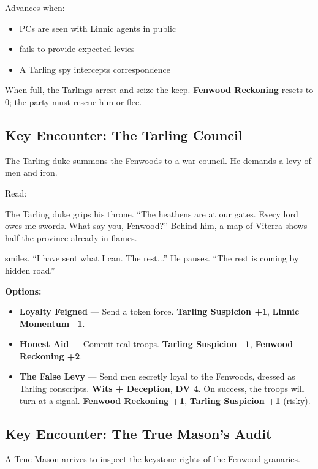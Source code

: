\documentclass[11pt,a5paper]{book}
\newcommand{\dv}[1]{\textbf{DV #1}}
\begin{document}
Advances when:
\begin{itemize}[leftmargin=*]
\item PCs are seen with Linnic agents in public
\item \aldric{} fails to provide expected levies
\item A Tarling spy intercepts correspondence
\end{itemize}
When full, the Tarlings arrest \aldric{} and seize the keep. \textbf{Fenwood Reckoning} resets to 0; the party must rescue him or flee.

\subsection*{Key Encounter: The Tarling Council}

The Tarling duke summons the Fenwoods to a war council. He demands a levy of men and iron.

Read:
\begin{quoting}
The Tarling duke grips his throne. ``The heathens are at our gates. Every lord owes me swords. What say you, Fenwood?'' Behind him, a map of Viterra shows half the province already in flames.

\aldric{} smiles. ``I have sent what I can. The rest...'' He pauses. ``The rest is coming by hidden road.''
\end{quoting}

\textbf{Options:}
\begin{itemize}[leftmargin=*]
\item \textbf{Loyalty Feigned} --- Send a token force. \textbf{Tarling Suspicion +1}, \textbf{Linnic Momentum --1}.
\item \textbf{Honest Aid} --- Commit real troops. \textbf{Tarling Suspicion --1}, \textbf{Fenwood Reckoning +2}.
\item \textbf{The False Levy} --- Send men secretly loyal to the Fenwoods, dressed as Tarling conscripts. \textbf{Wits + Deception}, \dv{4}. On success, the troops will turn at a signal. \textbf{Fenwood Reckoning +1}, \textbf{Tarling Suspicion +1} (risky).
\end{itemize}

\subsection*{Key Encounter: The True Mason's Audit}

A True Mason arrives to inspect the keystone rights of the Fenwood granaries.
\end{document}
